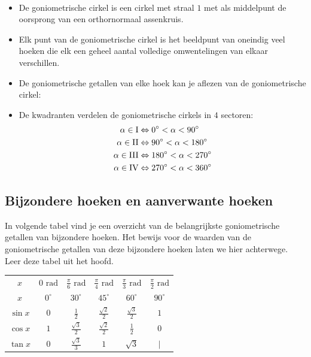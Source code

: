 \begin{onthoud}
	\ \\
	\begin{itemize}
	\item De goniometrische cirkel is een cirkel met straal $1$ met als middelpunt de oorsprong van een orthornormaal assenkruis.
	\item Elk punt van de goniometrische cirkel is het beeldpunt van oneindig veel hoeken die elk een geheel aantal volledige omwentelingen van elkaar verschillen.
	\item De goniometrische getallen van elke hoek kan je aflezen van de goniometrische cirkel:
	\item De kwadranten verdelen de goniometrische cirkels in $4$ sectoren:
\begin{align*}
\alpha \in \textup{I} &\Leftrightarrow 0^\circ < \alpha < 90^\circ\\
\alpha \in \textup{II} &\Leftrightarrow 90^\circ < \alpha < 180^\circ\\
\alpha \in \textup{III} &\Leftrightarrow 180^\circ < \alpha < 270^\circ\\
\alpha \in \textup{IV} &\Leftrightarrow 270^\circ < \alpha < 360^\circ
\end{align*}
\end{itemize}

\end{onthoud}

\subsection{Bijzondere hoeken en aanverwante hoeken}

In volgende tabel vind je een overzicht van de belangrijkste goniometrische getallen van bijzondere hoeken. Het bewijs voor de waarden van de goniometrische getallen van deze bijzondere hoeken laten we hier achterwege. Leer deze tabel uit het hoofd.

\begin{tabular}{c|ccccc}
$x$ &	$0 \text{ rad}$& $\frac{\pi}{6} \text{ rad}$ &	$\frac{\pi}{4} \text{ rad}$ &$\frac{\pi}{3} \text{ rad}$ &	 $\frac{\pi}{2} \text{ rad}$ \\
$x$ &	$0^\circ$&	$30^\circ$	&$45^\circ$&	$60^\circ$&	$90^\circ$\\
\hline
$\sin x$ &	$0$	&$\frac{1}{2}$&	$\frac{\sqrt{2}}{2}$& $\frac{\sqrt{3}}{2}$&	$1$ \\
$\cos x$ &	$1$	&$\frac{\sqrt{3}}{2}$&	$\frac{\sqrt{2}}{2}$&	$\frac{1}{2}$&	$0$ \\
$\tan x$ &	$0$	&$\frac{\sqrt{3}}{3}$&	$1$&	$\sqrt{3}$	 &  $|$ \\
\end{tabular}

